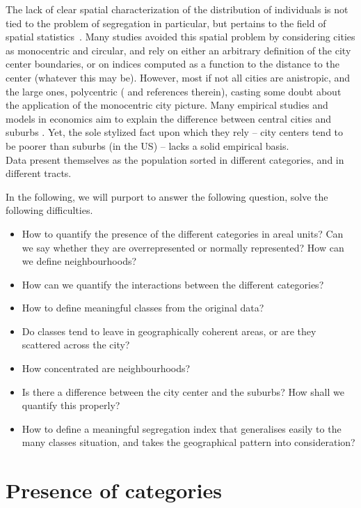 The lack of clear spatial characterization of the distribution of individuals is
not tied to the problem of segregation in particular, but pertains to the field
of spatial statistics~\cite{Ripley:1981}. Many studies avoided this spatial
problem by considering cities as monocentric and circular, and rely on either an
arbitrary definition of the city center boundaries, or on indices computed as a
function to the distance to the center (whatever this may be). However, most if
not all cities are anistropic, and the large ones, polycentric
(\cite{Louf:2013_polycentric}
and references therein), casting some doubt about the application of the
monocentric city picture. Many empirical studies and models in economics aim to
explain the difference between central cities and suburbs \cite{Glaeser:2008,
Brueckner:1999}. Yet, the sole stylized fact upon which they rely -- city centers
tend to be poorer than suburbs (in the US) -- lacks a solid empirical
basis.\\

Data present themselves as the population sorted in different categories, and in
different tracts.

In the following, we will purport to answer the following question, solve the
following difficulties.

\begin{itemize}
    \item How to quantify the presence of the different categories in areal
        units? Can we say whether they are overrepresented or normally
        represented? How can we define neighbourhoods?
    \item How can we quantify the interactions between the different categories?
    \item How to define meaningful classes from the original data?
    \item Do classes tend to leave in geographically coherent areas, or are they
        scattered across the city?
    \item How concentrated are neighbourhoods?
    \item Is there a difference between the city center and the suburbs? How
        shall we quantify this properly?
    \item How to define a meaningful segregation index that generalises easily
        to the many classes situation, and takes the geographical pattern into
        consideration?
\end{itemize}

\section{Presence of categories}
\label{sec:presence_of_categories}

